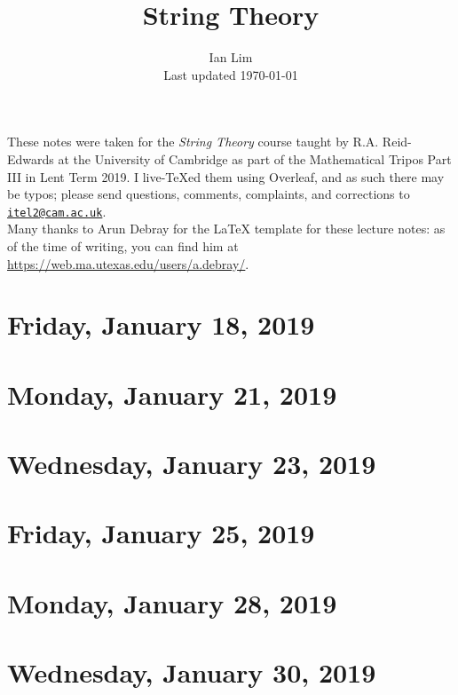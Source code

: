 \documentclass[reqno]{amsart}
\begin{document}
\title{String Theory}
\author{Ian Lim\\ Last updated \today}
\maketitle
{\small\noindent These notes were taken for the \textit{String Theory} course taught by R.A. Reid-Edwards at the University of Cambridge as part of the Mathematical Tripos Part III in Lent Term 2019. I live-\TeX ed them using Overleaf, and as such there may be typos; please send questions, comments, complaints, and corrections to 
\href{mailto:itel2@cam.ac.uk?subject=STR\%20Lecture\%20Notes}{\texttt{itel2@cam.ac.uk}}.\\
Many thanks to Arun Debray for the {\LaTeX} template for these lecture notes: as of the time of writing, you can find him at \url{https://web.ma.utexas.edu/users/a.debray/}.}

\tableofcontents

\section{Friday, January 18, 2019}
	

\section{Monday, January 21, 2019}
    

\section{Wednesday, January 23, 2019}
    
    
\section{Friday, January 25, 2019}
    

\section{Monday, January 28, 2019}
    
    
\section{Wednesday, January 30, 2019}
    
    
\end{document}
